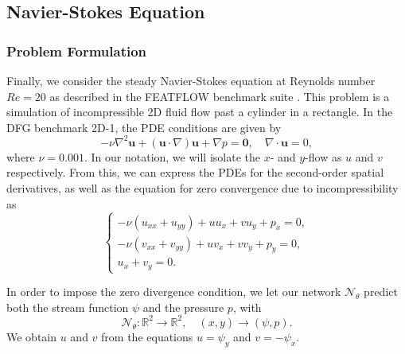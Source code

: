 \subsection{Navier-Stokes Equation}
\subsubsection{Problem Formulation}
Finally, we consider the steady Navier-Stokes equation at Reynolds number $Re = 20$ as described in the FEATFLOW benchmark suite \cite{DFG}.
This problem is a simulation of incompressible 2D fluid flow past a cylinder in a rectangle.
In the DFG benchmark 2D-1, the PDE conditions are given by
\begin{equation} \label{eq:NS}
    -\nu \nabla^2 \mathbf{u} + (\mathbf{u} \cdot \nabla)\mathbf{u} + \nabla p = \mathbf{0}, \quad \nabla \cdot \mathbf{u} = 0,
\end{equation}
where $\nu = 0.001$.
In our notation, we will isolate the $x$- and $y$-flow as $u$ and $v$ respectively.
From this, we can express the PDEs for the second-order spatial derivatives, as well as the equation for zero convergence due to incompressibility as
\begin{equation}
\begin{cases}
-\nu(u_{xx} + u_{yy})+uu_x+vu_y+p_x = 0, \\
-\nu(v_{xx} + v_{yy})+uv_x+vv_y+p_y = 0, \\
u_x + v_y = 0.
\end{cases}
\end{equation}

In order to impose the zero divergence condition, we let our network $\mathcal{N}_\theta$ predict both the stream function $\psi$ and the pressure $p$, with
\begin{equation}
    \mathcal{N}_\theta : \mathbb{R}^2 \to \mathbb{R}^2, \quad (x,y)\to (\psi, p).
\end{equation}
We obtain $u$ and $v$ from the equations $u=\psi_y$ and $v=-\psi_x$.

